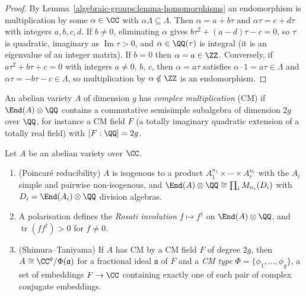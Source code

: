 \begin{proof}
By Lemma~\ref{algebraic-groups:lemma-homomorphisms} an endomorphism is multiplication by some $\alpha \in \CC$ with $\alpha\Lambda \subseteq \Lambda$. Then $\alpha = a + b\tau$ and
$\alpha\tau = c + d\tau$ with integers $a, b, c, d$. If $b \neq 0$, eliminating $\alpha$ gives $b\tau^2 + (a - d)\tau - c = 0$, so $\tau$ is quadratic, imaginary as $\operatorname{Im}\tau > 0$,
and $\alpha \in \QQ(\tau)$ is integral (it is an eigenvalue of an integer matrix). If $b = 0$ then $\alpha = a \in \ZZ$. Conversely, if $a\tau^2 + b\tau + c = 0$ with integers $a \neq 0$,
$b$, $c$, then $\alpha = a\tau$ satisfies $\alpha \cdot 1 = a\tau \in \Lambda$ and $\alpha\tau = -b\tau - c \in \Lambda$, so multiplication by $\alpha \notin \ZZ$ is an endomorphism.
\end{proof}

\begin{definition}\label{algebraic-groups:definition-cm}
An abelian variety $A$ of dimension $g$ has \emph{complex multiplication} (CM) if $\End(A) \otimes \QQ$ contains a commutative semisimple subalgebra of dimension $2g$ over $\QQ$,
for instance a CM field $F$ (a totally imaginary quadratic extension of a totally real field) with $[F : \QQ] = 2g$.
\end{definition}

\begin{theorem}\label{algebraic-groups:theorem-endomorphism-algebra}
Let $A$ be an abelian variety over $\CC$.
\begin{enumerate}
\item (Poincar\'e reducibility) $A$ is isogenous to a product $A_1^{n_1} \times \cdots \times A_r^{n_r}$ with the $A_i$ simple and pairwise non-isogenous, and
$\End(A) \otimes \QQ \cong \prod_iM_{n_i}(D_i)$ with $D_i = \End(A_i) \otimes \QQ$ division algebras.
\item A polarisation defines the \emph{Rosati involution} $f \mapsto f^\dagger$ on $\End(A) \otimes \QQ$, and $\operatorname{tr}(ff^\dagger) > 0$ for $f \neq 0$.
\item (Shimura--Taniyama) If $A$ has CM by a CM field $F$ of degree $2g$, then $A \cong \CC^g/\Phi(\mathfrak{a})$ for a fractional ideal $\mathfrak{a}$ of $F$ and a \emph{CM type}
$\Phi = \{\phi_1, \ldots, \phi_g\}$, a set of embeddings $F \to \CC$ containing exactly one of each pair of complex conjugate embeddings.
\end{enumerate}
\end{theorem}

